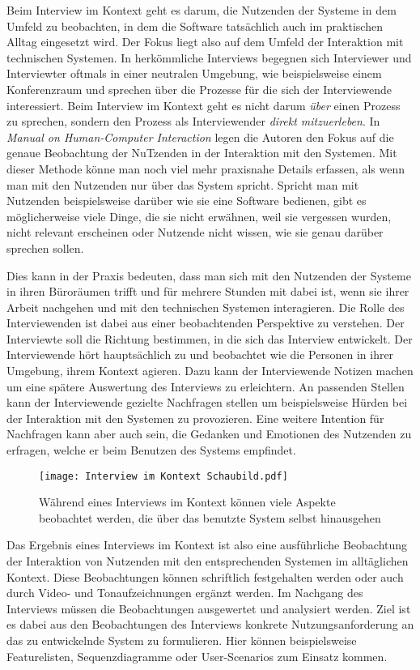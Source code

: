 Beim Interview im Kontext geht es darum, die Nutzenden der Systeme in dem
Umfeld zu beobachten, in dem die Software tatsächlich auch im praktischen
Alltag eingesetzt wird. Der Fokus liegt also auf dem Umfeld der Interaktion mit
technischen Systemen. In herkömmliche Interviews begegnen sich Interviewer und
Interviewter oftmals in einer neutralen Umgebung, wie beispielsweise einem
Konferenzraum und sprechen über die Prozesse für die sich der Interviewende
interessiert. Beim Interview im Kontext geht es nicht darum \textit{über} einen
Prozess zu sprechen, sondern den Prozess als Interviewender \textit{direkt
    mitzuerleben}\cite{contextualDesign}. In \textit{Manual on Human-Computer
    Interaction} legen die Autoren den Fokus auf die genaue Beobachtung der
NuTzenden in der Interaktion mit den Systemen. Mit dieser Methode könne man
noch viel mehr praxisnahe Details erfassen, als wenn man mit den Nutzenden nur
über das System spricht. Spricht man mit Nutzenden beispielsweise darüber wie
sie eine Software bedienen, gibt es möglicherweise viele Dinge, die sie nicht
erwähnen, weil sie vergessen wurden, nicht relevant erscheinen oder Nutzende
nicht wissen, wie sie genau darüber sprechen sollen\cite{hciHandbook}.

Dies kann in der Praxis bedeuten, dass man sich mit den Nutzenden der Systeme
in ihren Büroräumen trifft und für mehrere Stunden mit dabei ist, wenn sie
ihrer Arbeit nachgehen und mit den technischen Systemen interagieren. Die Rolle
des Interviewenden ist dabei aus einer beobachtenden Perspektive zu verstehen.
Der Interviewte soll die Richtung bestimmen, in die sich das Interview
entwickelt. Der Interviewende hört hauptsächlich zu und beobachtet wie die
Personen in ihrer Umgebung, ihrem Kontext agieren\cite{hciHandbook}. Dazu kann
der Interviewende Notizen machen um eine spätere Auswertung des Interviews zu
erleichtern. An passenden Stellen kann der Interviewende gezielte Nachfragen
stellen um beispielsweise Hürden bei der Interaktion mit den Systemen zu
provozieren. Eine weitere Intention für Nachfragen kann aber auch sein, die
Gedanken und Emotionen des Nutzenden zu erfragen, welche er beim Benutzen des
Systems empfindet.

\begin{figure}[h]
    \caption{Während eines Interviews im Kontext können viele Aspekte beobachtet werden, die über das benutzte System selbst hinausgehen\cite{johannesGrafik}}
    \centering
    \texttt{[image: Interview im Kontext Schaubild.pdf]}
\end{figure}

Das Ergebnis eines Interviews im Kontext ist also eine ausführliche Beobachtung
der Interaktion von Nutzenden mit den entsprechenden Systemen im alltäglichen
Kontext. Diese Beobachtungen können schriftlich festgehalten werden oder auch
durch Video- und Tonaufzeichnungen ergänzt werden. Im Nachgang des Interviews
müssen die Beobachtungen ausgewertet und analysiert werden. Ziel ist es dabei
aus den Beobachtungen des Interviews konkrete Nutzungsanforderung an das zu
entwickelnde System zu formulieren\cite{HMI-HCD}. Hier können beispielsweise Featurelisten,
Sequenzdiagramme oder User-Scenarios zum Einsatz kommen\cite{sequenceDiagrams}.